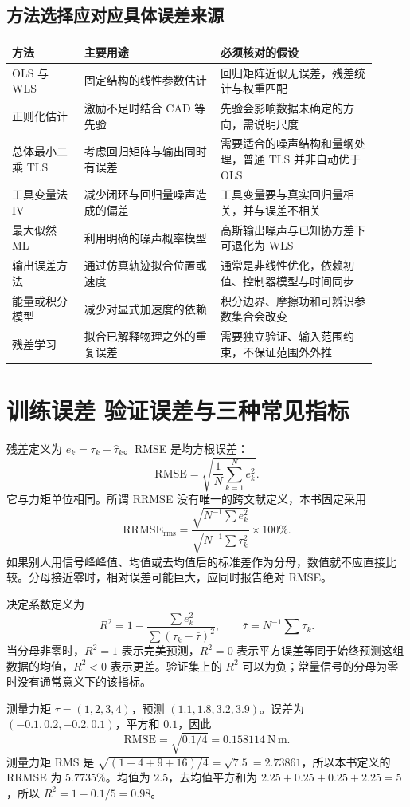 \subsection{方法选择应对应具体误差来源}
\begin{longtable}{p{0.18\linewidth}p{0.34\linewidth}p{0.39\linewidth}}
\toprule 方法&主要用途&必须核对的假设\\\midrule\endhead
OLS 与 WLS&固定结构的线性参数估计&回归矩阵近似无误差，残差统计与权重匹配\\
正则化估计&激励不足时结合 CAD 等先验&先验会影响数据未确定的方向，需说明尺度\\
总体最小二乘 \mbox{TLS}&考虑回归矩阵与输出同时有误差&需要适合的噪声结构和量纲处理，普通 TLS 并非自动优于 OLS\\
工具变量法 IV&减少闭环与回归量噪声造成的偏差&工具变量要与真实回归量相关，并与误差不相关\\
最大似然 ML&利用明确的噪声概率模型&高斯输出噪声与已知协方差下可退化为 WLS\\
输出误差方法&通过仿真轨迹拟合位置或速度&通常是非线性优化，依赖初值、控制器模型与时间同步\\
能量或积分模型&减少对显式加速度的依赖&积分边界、摩擦功和可辨识参数集合会改变\\
残差学习&拟合已解释物理之外的重复误差&需要独立验证、输入范围约束，不保证范围外外推\\\bottomrule
\end{longtable}

\section{训练误差 验证误差与三种常见指标}
残差定义为 $e_k=\tau_k-\hat\tau_k$。RMSE 是均方根误差：
\[
 \mathrm{RMSE}=\sqrt{\frac1N\sum_{k=1}^N e_k^2}.
\]
它与力矩单位相同。所谓 RRMSE 没有唯一的跨文献定义，本书固定采用
\[
 \mathrm{RRMSE}_{\mathrm{rms}}=\frac{\sqrt{N^{-1}\sum e_k^2}}{\sqrt{N^{-1}\sum\tau_k^2}}\times100\%.
\]
如果别人用信号峰峰值、均值或去均值后的标准差作为分母，数值就不应直接比较。分母接近零时，相对误差可能巨大，应同时报告绝对 RMSE。

决定系数定义为
\[
 R^2=1-\frac{\sum e_k^2}{\sum(\tau_k-\bar\tau)^2},\qquad
 \bar\tau=N^{-1}\sum\tau_k.
\]
当分母非零时，$R^2=1$ 表示完美预测，$R^2=0$ 表示平方误差等同于始终预测这组数据的均值，$R^2<0$ 表示更差。验证集上的 $R^2$ 可以为负；常量信号的分母为零时没有通常意义下的该指标。

\begin{examplebox}[算例 8E 把三个指标都算一遍]
测量力矩 $\tau=(1,2,3,4)$，预测 $(1.1,1.8,3.2,3.9)$。误差为 $(-0.1,0.2,-0.2,0.1)$，平方和 $0.1$，因此
\[
 \mathrm{RMSE}=\sqrt{0.1/4}=0.158114\ \mathrm{N\,m}.
\]
测量力矩 RMS 是 $\sqrt{(1+4+9+16)/4}=\sqrt{7.5}=2.73861$，所以本书定义的 RRMSE 为 $5.7735\%$。均值为 $2.5$，去均值平方和为 $2.25+0.25+0.25+2.25=5$，所以 $R^2=1-0.1/5=0.98$。
\end{examplebox}

